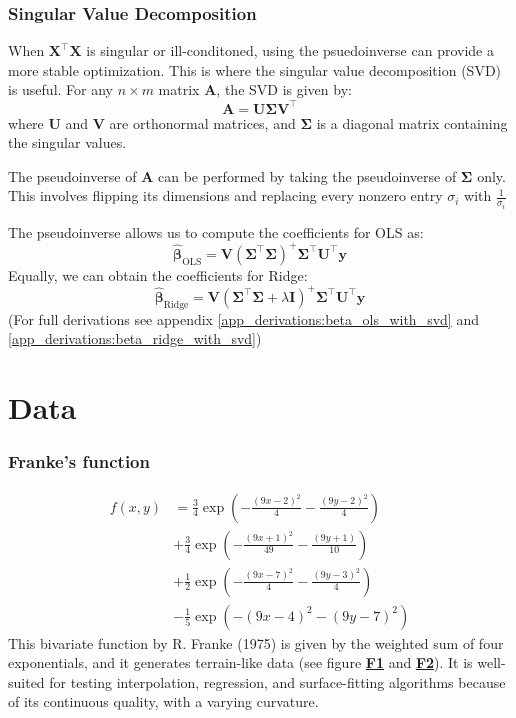 \documentclass{article}
\begin{document}
\begin{multicols}{2}
\subsubsection*{Singular Value Decomposition}
When $\mathbf{X}^\top\mathbf{X}$ is singular or ill-conditoned, using the psuedoinverse can provide a more stable optimization. This is where the singular value decomposition (SVD) is useful. For any $n \times m$ matrix $\mathbf{A}$, the SVD is given by:
$$\mathbf{A} = \mathbf{U}\mathbf{\Sigma}\mathbf{V^\top}$$
where $\mathbf{U}$ and $\mathbf{V}$ are orthonormal matrices, and $\mathbf{\Sigma}$ is a diagonal matrix containing the singular values.\cite{lay_linear_2016}

The pseudoinverse of $\mathbf{A}$ can be performed by taking the pseudoinverse of $\mathbf{\Sigma}$ only. This involves flipping its dimensions and replacing every nonzero entry $\sigma_i$
with $\frac{1}{\sigma_i}$

The pseudoinverse allows us to compute the coefficients for OLS as: 
$$ \hat{\bm{\beta}}_\text{OLS} = 
\mathbf{V}(\mathbf{\Sigma}^\top\mathbf{\Sigma})^{+}\mathbf{\Sigma}^\top\mathbf{U}^\top\bm{y} $$
Equally, we can obtain the coefficients for Ridge:
$$ \hat{\bm{\beta}}_\text{Ridge} = 
\mathbf{V}(\mathbf{\Sigma}^\top\mathbf{\Sigma} + \lambda\mathbf{I})^{+}\mathbf{\Sigma}^\top\mathbf{U}^\top\bm{y} $$
(For full derivations see appendix \ref{app_derivations:beta_ols_with_svd} and \ref{app_derivations:beta_ridge_with_svd})

\section*{Data}
\subsubsection*{Franke's function} 

\begin{align*}
f(x, y) &= \frac{3}{4} \exp\left(-\frac{(9x - 2)^2}{4} - \frac{(9y - 2)^2}{4}\right)\\ 
&+ \frac{3}{4} \exp\left(-\frac{(9x + 1)^2}{49} - \frac{(9y + 1)}{10}\right)\\
&+ \frac{1}{2} \exp\left(-\frac{(9x - 7)^2}{4} - \frac{(9y - 3)^2}{4}\right)\\ 
&- \frac{1}{5} \exp\left(-(9x - 4)^2 - (9y - 7)^2\right)
\end{align*}
This bivariate function by R. Franke (1975) \cite{franke_critical_1975} is given by the weighted sum of four exponentials, and it generates terrain-like data (see figure \hyperref[fig:F1]{\textbf{F1}} and \hyperref[fig:F1]{\textbf{F2}}). It is well-suited for testing interpolation, regression, and surface-fitting algorithms because of its continuous quality, with a varying curvature.


\end{multicols}
\end{document}
